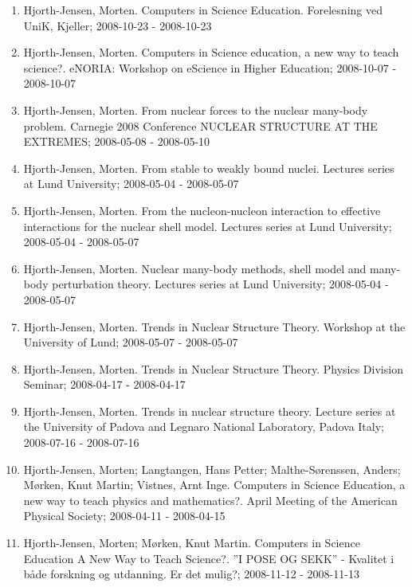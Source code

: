 \documentclass[a4wide,10pt]{article}
\begin{document}
\begin{enumerate}
\item Hjorth-Jensen, Morten.  Computers in Science Education. Forelesning ved UniK, Kjeller; 2008-10-23 - 2008-10-23

\item Hjorth-Jensen, Morten.  Computers in Science education, a new way to teach science?. eNORIA: Workshop on eScience in Higher Education; 2008-10-07 - 2008-10-07

\item Hjorth-Jensen, Morten.  From nuclear forces to the nuclear many-body problem. Carnegie 2008 Conference NUCLEAR STRUCTURE AT THE EXTREMES; 2008-05-08 - 2008-05-10

\item Hjorth-Jensen, Morten.  From stable to weakly bound nuclei. Lectures series at Lund University; 2008-05-04 - 2008-05-07

\item Hjorth-Jensen, Morten.  From the nucleon-nucleon interaction to effective interactions for the nuclear shell model. Lectures series at Lund University; 2008-05-04 - 2008-05-07

\item Hjorth-Jensen, Morten.  Nuclear many-body methods, shell model and many-body perturbation theory. Lectures series at Lund University; 2008-05-04 - 2008-05-07

\item Hjorth-Jensen, Morten.  Trends in Nuclear Structure Theory. Workshop at the University of Lund; 2008-05-07 - 2008-05-07

\item Hjorth-Jensen, Morten.  Trends in Nuclear Structure Theory. Physics Division Seminar; 2008-04-17 - 2008-04-17

\item Hjorth-Jensen, Morten.  Trends in nuclear structure theory. Lecture series at the University of Padova and Legnaro National Laboratory, Padova Italy; 2008-07-16 - 2008-07-16

\item Hjorth-Jensen, Morten; Langtangen, Hans Petter; Malthe-Sørenssen, Anders; Mørken, Knut Martin; Vistnes, Arnt Inge.  Computers in Science Education, a new way to teach physics and mathematics?. April Meeting of the American Physical Society; 2008-04-11 - 2008-04-15

\item Hjorth-Jensen, Morten; Mørken, Knut Martin.  Computers in Science Education A New Way to Teach Science?. ”I POSE OG SEKK” - Kvalitet i både forskning og utdanning. Er det mulig?; 2008-11-12 - 2008-11-13


\end{enumerate}
\end{document}
